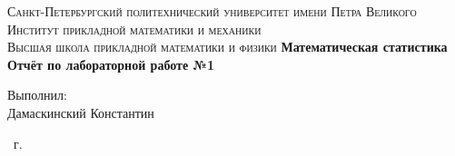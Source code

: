 \documentclass[14pt,a4paper,article]{ncc}
\begin{document}
\begin{titlepage}
    \begin{center}
        \textsc{
            Санкт-Петербургский политехнический университет имени Петра Великого \\[5mm]
            Институт прикладной математики и механики\\[2mm]
            Высшая школа прикладной математики и физики            
        }   
        \vfill
        \textbf{\large
            Математическая статистика\\
            Отчёт по лабораторной работе №1 \\[3mm]
        }                
    \end{center}

    \vfill
    \hfill
    \begin{minipage}{0.5\textwidth}
        Выполнил: \\[2mm]   
        Дамаскинский Константин
    \end{minipage}

    \vfill
    \begin{center}
        \theyear\ г.
    \end{center}
\end{titlepage}

\tableofcontents


\end{document}
